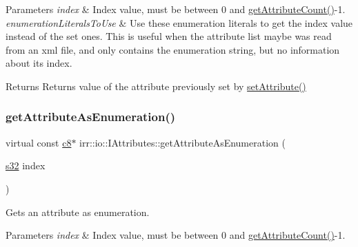 \begin{DoxyParams}{Parameters}
{\em index} & Index value, must be between 0 and \hyperlink{classirr_1_1io_1_1IAttributes_a796bdd9440ee7ba0b6742a90a82870b6}{get\+Attribute\+Count()}-\/1. \\
\hline
{\em enumeration\+Literals\+To\+Use} & Use these enumeration literals to get the index value instead of the set ones. This is useful when the attribute list maybe was read from an xml file, and only contains the enumeration string, but no information about its index. \\
\hline
\end{DoxyParams}
\begin{DoxyReturn}{Returns}
Returns value of the attribute previously set by \hyperlink{classirr_1_1io_1_1IAttributes_a03fa31acb481ae23678676cc183f09a6}{set\+Attribute()} 
\end{DoxyReturn}
\mbox{\label{classirr_1_1io_1_1IAttributes_a195cd7ee6a50a6a10d22a874072a93c9}} 
\subsubsection{\texorpdfstring{get\+Attribute\+As\+Enumeration()}{getAttributeAsEnumeration()}\hspace{0.1cm}{\footnotesize\ttfamily [4/4]}}
{\footnotesize\ttfamily virtual const \hyperlink{namespaceirr_a9395eaea339bcb546b319e9c96bf7410}{c8}$\ast$ irr\+::io\+::\+I\+Attributes\+::get\+Attribute\+As\+Enumeration (\begin{DoxyParamCaption}\item[{\hyperlink{namespaceirr_ac66849b7a6ed16e30ebede579f9b47c6}{s32}}]{index }\end{DoxyParamCaption})\hspace{0.3cm}{\ttfamily [pure virtual]}}



Gets an attribute as enumeration. 


\begin{DoxyParams}{Parameters}
{\em index} & Index value, must be between 0 and \hyperlink{classirr_1_1io_1_1IAttributes_a796bdd9440ee7ba0b6742a90a82870b6}{get\+Attribute\+Count()}-\/1. \\
\hline
\end{DoxyParams}
\mbox{\label{classirr_1_1io_1_1IAttributes_a9bfcf5b9dae3fa18796c74888bef977f}} 
